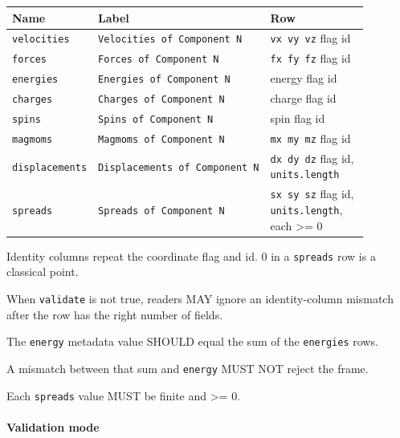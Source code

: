 \begin{center}
\footnotesize
\begin{tabular}{@{}p{0.19\linewidth}p{0.30\linewidth}p{0.39\linewidth}@{}}
\toprule
\raggedright Name & \raggedright Label & \raggedright Row \tabularnewline
\midrule
\raggedright \texttt{velocities} & \raggedright \texttt{Velocities\ of\ Component\ N} & \raggedright \texttt{vx\ vy\ vz} flag id \tabularnewline
\raggedright \texttt{forces} & \raggedright \texttt{Forces\ of\ Component\ N} & \raggedright \texttt{fx\ fy\ fz} flag id \tabularnewline
\raggedright \texttt{energies} & \raggedright \texttt{Energies\ of\ Component\ N} & \raggedright energy flag
id \tabularnewline
\raggedright \texttt{charges} & \raggedright \texttt{Charges\ of\ Component\ N} & \raggedright charge flag
id \tabularnewline
\raggedright \texttt{spins} & \raggedright \texttt{Spins\ of\ Component\ N} & \raggedright spin flag id \tabularnewline
\raggedright \texttt{magmoms} & \raggedright \texttt{Magmoms\ of\ Component\ N} & \raggedright \texttt{mx\ my\ mz} flag id \tabularnewline
\raggedright \texttt{displacements} & \raggedright \texttt{Displacements\ of\ Component\ N} & \raggedright \texttt{dx\ dy\ dz} flag id, \texttt{units.length} \tabularnewline
\raggedright \texttt{spreads} & \raggedright \texttt{Spreads\ of\ Component\ N} & \raggedright \texttt{sx\ sy\ sz} flag id, \texttt{units.length}, each \textgreater=
0 \tabularnewline
\bottomrule
\end{tabular}
\end{center}

Identity columns repeat the coordinate flag and id. 0 in a
\texttt{spreads} row is a classical point.

\begin{description}
\tightlist
\item[CON-section.17 (MAY)] When \texttt{validate} is not true, readers MAY ignore an
identity-column mismatch after the row has the right number of fields.
\item[CON-section.18 (SHOULD)] The \texttt{energy} metadata value SHOULD equal the sum of the
\texttt{energies} rows.
\item[CON-section.19 (MUST NOT)] A mismatch between that sum and \texttt{energy} MUST NOT
reject the frame.
\item[CON-section.20 (MUST)] Each \texttt{spreads} value MUST be finite and \textgreater= 0.
\end{description}

\paragraph{Validation mode}\label{spec:validation-mode}

